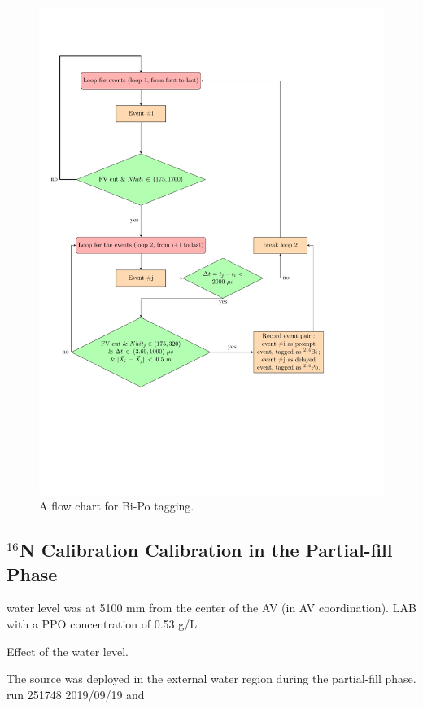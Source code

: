 \begin{figure}[!htb]
	\centering
	\includegraphics[width=15cm]{flowchart_latex.pdf}
	\caption{A flow chart for Bi-Po tagging.}
	\label{biPo_flowchart}
\end{figure}




\subsection{$^{16}$N Calibration Calibration in the Partial-fill Phase}

water level was at 5100 mm from the center of the AV (in AV coordination).
LAB with a PPO concentration of 0.53 g/L  

Effect of the water level.



The  source was deployed in the external water region during the partial-fill phase.
run 251748 2019/09/19 and 


